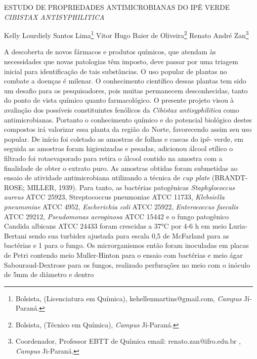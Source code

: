 \documentclass[article,12pt,onesidea,4paper,english,brazil]{abntex2}
\begin{document}
	
	
	\frenchspacing 
	
	\begin{center}
		\LARGE ESTUDO DE PROPRIEDADES ANTIMICROBIANAS DO IPÊ VERDE \MakeUppercase{\textit{Cibistax
		antisyphilitica}}
		
		\normalsize
		Kelly Lourdiely Santos Lima\footnote{Bolsista, (Licenciatura em Química), kehellenmartins@gmail.com, \textit{Campus} Jí-Paraná.} 
		Vitor Hugo Baier de Oliveira\footnote{Bolsista, (Técnico em Química), \textit{Campus} Jí-Paraná.} 
		Renato André Zan\footnote{Coordenador, Professor EBTT de Química email: renato.zan@ifro.edu.br , \textit{Campus} Ji-Paraná.} 
	\end{center}
	
	\noindent A descoberta de novos fármacos e produtos químicos, que atendam às
	necessidades que novas patologias têm imposto, deve passar por uma triagem
	inicial para identificação de tais substâncias. O uso popular de plantas no combate a
	doenças é milenar. O conhecimento científico dessas plantas tem sido um desafio
	para os pesquisadores, pois muitas permanecem desconhecidas, tanto do ponto de
	vista químico quanto farmacológico. O presente projeto visou à avaliação dos
	possíveis constituintes fenólicos da \textit{Cibistax antisyphilitica} como antimicrobianas.
	Portanto o conhecimento químico e do potencial biológico destes compostos irá
	valorizar essa planta da região do Norte, favorecendo assim seu uso popular.
	De início foi coletado as amostras de folhas e cascas do ipê-
	verde, em seguida as amostras foram higienizadas e pesadas, adicionou álcool
	etílico o filtrado foi rotaevaporado para retira o álcool contido na amostra com a
	finalidade de obter o extrato puro. As amostras obtidas foram submetidas ao ensaio
	de atividade antimicrobiana utilizando a técnica de \textit{cup plate} (BRANDT-ROSE;
	MILLER, 1939). Para tanto, as bactérias patogênicas \textit{Staphylococcus aureus} ATCC
	25923, Streptococcus pneumoniae ATCC 11733, \textit{Klebsiella pneumoniae} ATCC
	4952, \textit{Escherichia coli} ATCC 25922, \textit{Enterococcus faecalis} ATCC 29212,
	\textit{Pseudomonas aeroginosa} ATCC 15442 e o fungo patogênico Candida albicans
	ATCC 24433 foram crescidas a 37°C por 4-6 h em meio Luria-Bertani sendo sua
	turbidez ajustada para escala 0,5 de McFarland para as bactérias e 1 para o fungo.
	Os microrganismos então foram inoculadas em placas de Petri contendo meio
	Muller-Hinton para o ensaio com bactérias e meio ágar Sabouraud-Dextrose para os
	fungos, realizado perfurações no meio com o inóculo de 5mm de diâmetro e dentro
\end{document}
